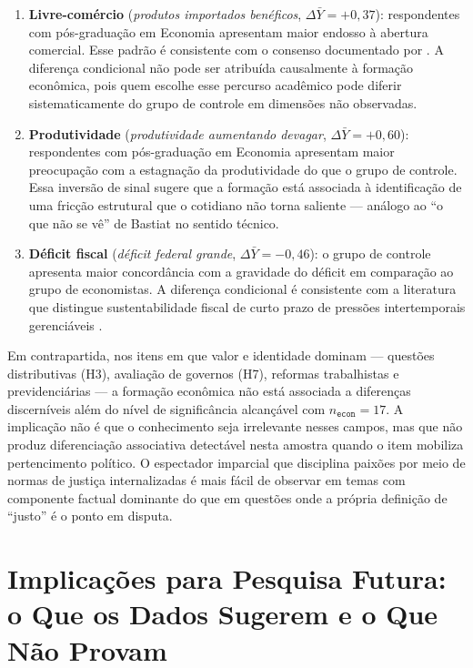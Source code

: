 \begin{enumerate}[label=\roman*)]
    \item \textbf{Livre-comércio} (\textit{produtos importados benéficos}, $\Delta\bar{Y} = +0{,}37$): respondentes com pós-graduação em Economia apresentam maior endosso à abertura comercial. Esse padrão é consistente com o consenso documentado por . A diferença condicional não pode ser atribuída causalmente à formação econômica, pois quem escolhe esse percurso acadêmico pode diferir sistematicamente do grupo de controle em dimensões não observadas.

    \item \textbf{Produtividade} (\textit{produtividade aumentando devagar}, $\Delta\bar{Y} = +0{,}60$): respondentes com pós-graduação em Economia apresentam maior preocupação com a estagnação da produtividade do que o grupo de controle. Essa inversão de sinal sugere que a formação está associada à identificação de uma fricção estrutural que o cotidiano não torna saliente — análogo ao ``o que não se vê'' de Bastiat \cite{bastiat2010oqueseve} no sentido técnico.

    \item \textbf{Déficit fiscal} (\textit{déficit federal grande}, $\Delta\bar{Y} = -0{,}46$): o grupo de controle apresenta maior concordância com a gravidade do déficit em comparação ao grupo de economistas. A diferença condicional é consistente com a literatura que distingue sustentabilidade fiscal de curto prazo de pressões intertemporais gerenciáveis \cite{franco2017moeda}.
\end{enumerate}

Em contrapartida, nos itens em que valor e identidade dominam — questões distributivas (H3), avaliação de governos (H7), reformas trabalhistas e previdenciárias — a formação econômica não está associada a diferenças discerníveis além do nível de significância alcançável com $n_{\texttt{econ}} = 17$. A implicação não é que o conhecimento seja irrelevante nesses campos, mas que não produz diferenciação associativa detectável nesta amostra quando o item mobiliza pertencimento político. O espectador imparcial que disciplina paixões por meio de normas de justiça internalizadas \cite{smith1759-theory-of-moral-sentiments} é mais fácil de observar em temas com componente factual dominante do que em questões onde a própria definição de ``justo'' é o ponto em disputa.

\section{Implicações para Pesquisa Futura: o Que os Dados Sugerem e o Que Não Provam}
\label{sec:arco-institucional}

